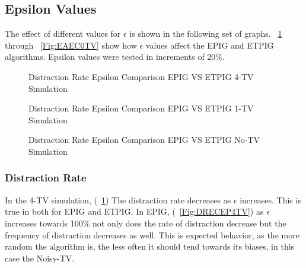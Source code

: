 \documentclass[letterpaper]{article} %
\begin{document}
\subsection{Epsilon Values}
The effect of different values for $\epsilon$ is shown in the following set of graphs. \figurename~\ref{Fig:DREC4TV} through \figurename~\ref{Fig:EAEC0TV} show how $\epsilon$ values affect the EPIG and ETPIG algorithms. Epsilon values were tested in increments of 20\%.
\begin{figure}
	\begin{center}
		\hfill
		
		\hfill
	\end{center}
	\caption{Distraction Rate Epsilon Comparison EPIG VS ETPIG 4-TV Simulation}
	\label{Fig:DREC4TV}
\end{figure}

\begin{figure}	
	\begin{center}
		\hfill
		
		\hfill
	\end{center}
	\caption{Distraction Rate Epsilon Comparison EPIG VS ETPIG 1-TV Simulation}
	\label{Fig:DREC1TV}
\end{figure}

\begin{figure}	
	\begin{center}
		\hfill
		
		\hfill
	\end{center}	
	\caption{Distraction Rate Epsilon Comparison EPIG VS ETPIG No-TV Simulation}
	\label{Fig:DREC0TV}
\end{figure}


\subsubsection{Distraction Rate}
In the 4-TV simulation, (\figurename~\ref{Fig:DREC4TV}) The distraction rate decreases as $\epsilon$ increases. This is true in both for EPIG and ETPIG. In EPIG, (\figurename~\ref{Fig:DRECEP4TV}) as $\epsilon$ increases towards 100\% not only does the rate of distraction decrease but the frequency of distraction decreases as well. This is expected behavior, as the more random the algorithm is, the less often it should tend towards its biases, in this case the Noisy-TV.
\end{document}
